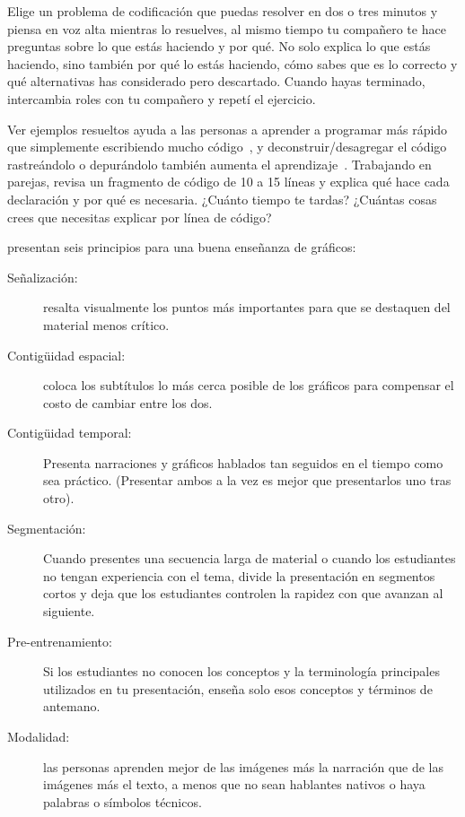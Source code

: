 Elige un problema de codificación que puedas resolver en dos o tres minutos 
y piensa en voz alta mientras lo resuelves, 
al mismo tiempo tu compañero te hace preguntas sobre lo que estás haciendo y por qué. 
No solo explica lo que estás haciendo, 
sino también por qué lo estás haciendo, 
cómo sabes que es lo correcto y qué alternativas has considerado pero descartado. 
Cuando hayas terminado, 
intercambia roles con tu compañero y repetí el ejercicio.



Ver ejemplos resueltos ayuda a las personas a aprender a programar más rápido que simplemente escribiendo mucho código~\cite{Skud2014}, 
y deconstruir/desagregar el código rastreándolo o depurándolo también aumenta el aprendizaje~\cite{Grif2016}.
Trabajando en parejas, revisa un fragmento de código de 10 a 15 líneas 
y explica qué hace cada declaración y por qué es necesaria. 
¿Cuánto tiempo te tardas? 
¿Cuántas cosas crees que necesitas explicar por línea de código?


\cite{Maye2009,Mill2016a} presentan seis principios para una buena enseñanza de gráficos:

\begin{description}

\item[Señalización:]
  resalta visualmente los puntos más importantes 
  para que se destaquen del material menos crítico.

\item[Contigüidad espacial:]
  coloca los subtítulos lo más cerca posible de los gráficos para compensar el costo de cambiar entre los dos.

\item[Contigüidad temporal:]
  Presenta narraciones y gráficos hablados tan seguidos en el tiempo como sea práctico. 
  (Presentar ambos a la vez es mejor que presentarlos uno tras otro).

\item[Segmentación:]
  Cuando presentes una secuencia larga de material o 
  cuando los estudiantes no tengan experiencia con el tema, 
  divide la presentación en segmentos cortos y deja que los estudiantes controlen la rapidez con que avanzan al siguiente.

\item[Pre-entrenamiento:]
  Si los estudiantes no conocen los conceptos y la terminología principales utilizados en tu presentación, 
  enseña solo esos conceptos y términos de antemano.

\item[Modalidad:]
las personas aprenden mejor de las imágenes más la narración que de las imágenes más el texto, 
a menos que no sean hablantes nativos o haya palabras o símbolos técnicos.

\end{description}

